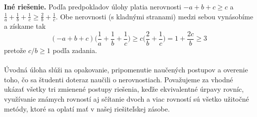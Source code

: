 \textbf{Iné riešenie.} Podľa predpokladov úlohy platia nerovnosti $-a + b + c \geq c$ a $\frac{1}{a}+\frac{1}{b}+\frac{1}{c}\geq \frac{2}{b}+\frac{1}{c}$.
Obe nerovnosti (s kladnými stranami) medzi sebou vynásobíme a získame tak $$(-a + b + c)\bigg(\frac{1}{a}+\frac{1}{b}+\frac{1}{c}\bigg) \geq c \bigg( \frac{2}{b}+\frac{1}{c}\bigg)=1 +\frac{2c}{b}\geq 3$$
pretože $c/b \geq 1$ podľa zadania.\\
\\
\kom Úvodná úloha slúži na opakovanie, pripomenutie naučených postupov a overenie toho, čo sa študenti doteraz naučili o nerovnostiach. Považujeme za vhodné ukázať všetky tri zmienené postupy riešenia, keďže ekvivalentné úrpavy rovníc, využívanie známych rovností aj sčítanie dvoch a viac rovností sú všetko užitočné metódy, ktoré sa oplatí mať v našej riešiteľskej zásobe.




